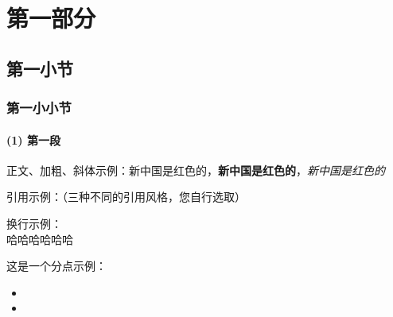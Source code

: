 \documentclass[withoutpreface,bwprint]{cumcmthesis}
\begin{document}


\section{第一部分}

\subsection{第一小节}

\subsubsection{第一小小节}

\paragraph{(1) \quad 第一段}



正文、加粗、斜体示例：新中国是红色的，\textbf{新中国是红色的}，\textit{新中国是红色的} 

引用示例：（三种不同的引用风格，您自行选取）
\cite{theodoris2023transfer}  \supercite{theodoris2023transfer}


换行示例：\\哈哈哈哈哈哈

这是一个分点示例：

\begin{itemize}
    \item 
    \item 
\end{itemize}


\newpage
\end{document}
